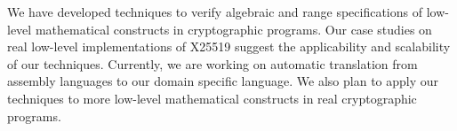 
We have developed techniques to verify algebraic and range specifications of
low-level mathematical constructs in cryptographic programs. Our case
studies on real low-level implementations of X25519 suggest the
applicability and scalability of our techniques.
Currently, we are working on automatic translation from assembly languages to our domain specific language.
We also plan to apply our techniques to more low-level mathematical constructs in real
cryptographic programs.
